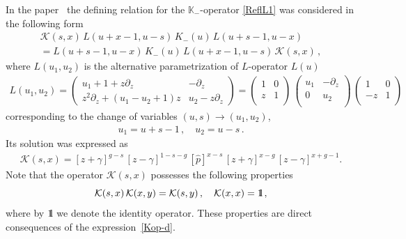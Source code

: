 \documentclass[a4paper,11pt]{article}
\def\II{\hbox{{1}\kern-.25em\hbox{l}}}
\numberwithin{equation}{section}
\begin{document}
In the paper~\cite{ABDV} the defining relation for the $\mathbb{K}_-$-operator \eqref{ReflL1} was considered in the following form
\begin{multline} \label{Kdef}
	\mathcal{K}(s,x) \, L(u +x - 1, u - s) \, K_-(u) \, L(u  + s - 1, u - x) \\
	= L(u + s - 1, u - x) \, K_-(u) \, L(u + x - 1, u - s) \, 
	\mathcal{K}(s,x) \,,
\end{multline}
where $L(u_1,u_2)$ is the alternative parametrization of $L$-operator $L(u)$~\cite{Derkachov:2005hw}
\begin{align} \label{Lfact}
	L(u_1, u_2) = 
	\left(\begin{array}{cc} u_1+1+z \partial_z & -\partial_z\\
		z^2 \partial_z + (u_1-u_2+1) z & u_2-z\partial_z
	\end{array}\right) 
	= 
	\left(%
	\begin{array}{cc}
		1 & 0 \\
		z & 1 \\
	\end{array}%
	\right)\,\left(%
	\begin{array}{cc}
		u_1 & -\partial_{z} \\
		0 & u_2 \\
	\end{array}%
	\right)\, \left(%
	\begin{array}{cc}
		1 & 0 \\
		-z & 1 \\
	\end{array}%
	\right)
\end{align}
corresponding to the change of variables $(u,s) \to (u_1, u_2)$,
\begin{align*}
	u_1 = u+s-1 \,, \quad  u_2 = u-s \,.
\end{align*}
Its solution was expressed as
\begin{align}\label{Kop-d}
	\mathcal{K}(s,x) =
	[z+\gamma]^{g-s} \,
	[z-\gamma]^{1-s-g} \,
	[\hat{p}]^{x-s} \,
	[z+\gamma]^{x-g} \,
	[z-\gamma]^{x+g-1}.
\end{align}
Note that the operator $\mathcal{K}(s,x)$ possesses the following properties 
\begin{equation}\nonumber
	\mathcal{K}(s,x)\,\mathcal{K}(x,y) = \mathcal{K}(s,y) \,, \quad \mathcal{K}(x,x) = \II \,,
\end{equation}
where by $\II$ we denote the identity operator.
These properties are direct consequences of the expression~\eqref{Kop-d}.
\end{document}
